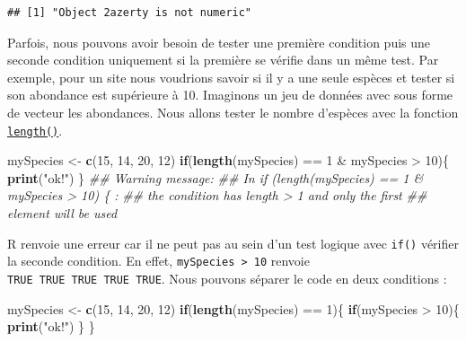\documentclass[twoside,symmetric]{book}
\newenvironment{Shaded}{}{}
\newcommand{\CommentTok}[1]{\textit{#1}}
\newcommand{\ControlFlowTok}[1]{\textbf{#1}}
\newcommand{\DecValTok}[1]{#1}
\newcommand{\KeywordTok}[1]{\textbf{#1}}
\newcommand{\NormalTok}[1]{#1}
\newcommand{\OperatorTok}[1]{#1}
\newcommand{\StringTok}[1]{#1}
\begin{document}
\begin{verbatim}
## [1] "Object 2azerty is not numeric"
\end{verbatim}

Parfois, nous pouvons avoir besoin de tester une première condition puis une seconde condition uniquement si la première se vérifie dans un même test. Par exemple, pour un site nous voudrions savoir si il y a une seule espèces et tester si son abondance est supérieure à 10. Imaginons un jeu de données avec sous forme de vecteur les abondances. Nous allons tester le nombre d'espèces avec la fonction \protect\hyperlink{l015length}{\texttt{length()}}.

\begin{Shaded}
\begin{Highlighting}[]
\NormalTok{mySpecies <-}\StringTok{ }\KeywordTok{c}\NormalTok{(}\DecValTok{15}\NormalTok{, }\DecValTok{14}\NormalTok{, }\DecValTok{20}\NormalTok{, }\DecValTok{12}\NormalTok{)}
\ControlFlowTok{if}\NormalTok{(}\KeywordTok{length}\NormalTok{(mySpecies) }\OperatorTok{==}\StringTok{ }\DecValTok{1} \OperatorTok{&}\StringTok{ }\NormalTok{mySpecies }\OperatorTok{>}\StringTok{ }\DecValTok{10}\NormalTok{)\{}
  \KeywordTok{print}\NormalTok{(}\StringTok{"ok!"}\NormalTok{)}
\NormalTok{\}}
\CommentTok{## Warning message:}
\CommentTok{## In if (length(mySpecies) == 1 & mySpecies > 10) \{ :}
\CommentTok{##   the condition has length > 1 and only the first }
\CommentTok{##   element will be used}
\end{Highlighting}
\end{Shaded}

R renvoie une erreur car il ne peut pas au sein d'un test logique avec \texttt{if()} vérifier la seconde condition. En effet, \texttt{mySpecies\ \textgreater{}\ 10} renvoie \texttt{TRUE\ TRUE\ TRUE\ TRUE\ TRUE}. Nous pouvons séparer le code en deux conditions :

\begin{Shaded}
\begin{Highlighting}[]
\NormalTok{mySpecies <-}\StringTok{ }\KeywordTok{c}\NormalTok{(}\DecValTok{15}\NormalTok{, }\DecValTok{14}\NormalTok{, }\DecValTok{20}\NormalTok{, }\DecValTok{12}\NormalTok{)}
\ControlFlowTok{if}\NormalTok{(}\KeywordTok{length}\NormalTok{(mySpecies) }\OperatorTok{==}\StringTok{ }\DecValTok{1}\NormalTok{)\{}
  \ControlFlowTok{if}\NormalTok{(mySpecies }\OperatorTok{>}\StringTok{ }\DecValTok{10}\NormalTok{)\{}
    \KeywordTok{print}\NormalTok{(}\StringTok{"ok!"}\NormalTok{)}
\NormalTok{  \}}
\NormalTok{\}}
\end{Highlighting}
\end{Shaded}
\end{document}
